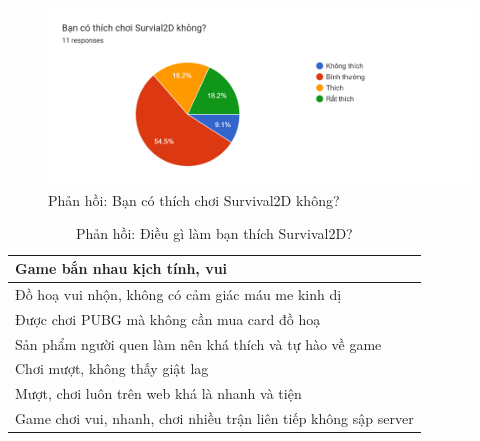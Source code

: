 \documentclass[12pt,a4paper]{article}
\begin{document}
  \begin{figure}[H]
      \centering
      \includegraphics[width=\textwidth]{Img/response/response6.png}
      \caption{Phản hồi: Bạn có thích chơi Survival2D không?}
  \end{figure}

  \begin{table}[H]
    \centering
    \begin{tabular}{|l|}
    \hline
    Game bắn nhau kịch tính, vui                                                \\ \hline
    Đồ hoạ vui nhộn, không có cảm giác máu me kinh dị                       \\ \hline
    Được chơi PUBG mà không cần mua card đồ hoạ
    \\ \hline
    Sản phẩm người quen làm nên khá thích và tự hào về game                                   \\ \hline
    Chơi mượt, không thấy giật lag                                              \\ \hline
    Mượt, chơi luôn trên web khá là nhanh và tiện                               \\ \hline
    Game chơi vui, nhanh, chơi nhiều trận liên tiếp không sập server
    \\ \hline
    \end{tabular}
    \caption{Phản hồi: Điều gì làm bạn thích Survival2D?}
  \end{table}
\end{document}
